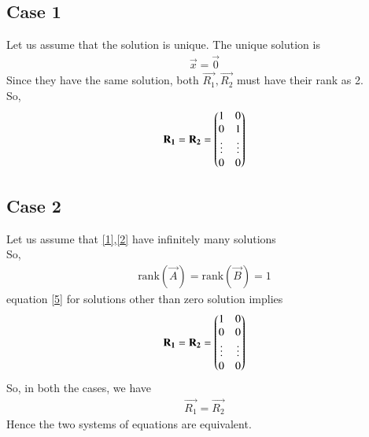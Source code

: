 \documentclass[journal,12pt,twocolumn]{IEEEtran}
\begin{document}
\subsection{Case 1}
Let us assume that the solution is unique.
The unique solution is
\begin{align}
    \vec{x}=\vec{0}
\end{align}
Since they have the same solution, both $\vec{R_1},\vec{R_2}$ must have their rank as 2.\\
So,
\begin{align}
    \mathbf{R_1}=\mathbf{R_2}=\begin{pmatrix}1&0\\0&1\\\vdots&\vdots\\0&0\end{pmatrix}
\end{align}

\subsection{Case 2}
Let us assume that \eqref{1},\eqref{2} have infinitely many solutions\\
So,
\begin{align}
\text{rank}(\vec{A})= \text{rank}(\vec{B}) = 1
\end{align}
equation \eqref{5} for solutions other than zero solution implies
\begin{align}
    \mathbf{R_1}=\mathbf{R_2}=\begin{pmatrix}1&0\\0&0\\\vdots&\vdots\\0&0\end{pmatrix}
\end{align}
So, in both the cases, we have 
\begin{align}
     \vec{R_1}=\vec{R_2}
\end{align}
Hence the two systems of equations are equivalent.
\end{document}
